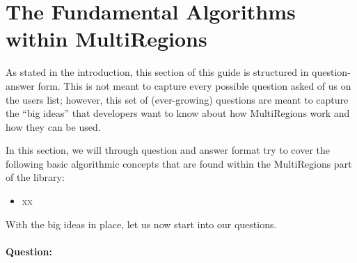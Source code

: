 %
\section{The Fundamental Algorithms within MultiRegions}

As stated in the introduction, this section of this guide is structured in question-answer form.  This is not meant to capture every possible
question asked of us on the {\nek} users list; however, this set of (ever-growing) questions are meant to capture the ``big ideas'' that developers 
want to know about how MultiRegions work and how they can be used.  

In this section, we will through question and answer format try to cover the following basic algorithmic concepts that are found within 
the MultiRegions part of the library:

\begin{itemize}
\item xx
\end{itemize}

With the big ideas in place, let us now start into our questions.

\paragraph{Question:}
